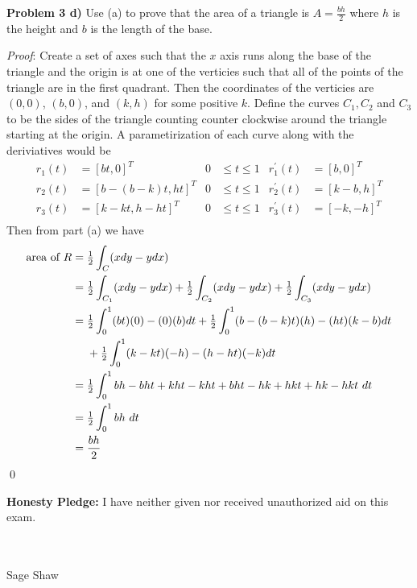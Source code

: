 \documentclass[12pt]{article}
\newcommand{\problem}[1]{\hspace{-4 ex} \large \textbf{Problem #1} }
\renewenvironment{proof}{\hspace{-4 ex} \emph{Proof}:}{\qed}
\begin{document}
\problem{3 d)} Use (a) to prove that the area of a triangle is $A=\tfrac{bh}{2}$ where $h$ is the height and $b$ is the length of the base.

	\begin{proof}
		Create a set of axes such that the $x$ axis runs along the base of the triangle and the origin is at one of the verticies such that all of the points of the triangle are in the first quadrant. Then the coordinates of the verticies are $(0,0)$, $(b,0)$, and $(k,h)$ for some positive $k$. Define the curves $C_1, C_2$ and $C_3$ to be the sides of the triangle counting counter clockwise around the triangle starting at the origin. A parametirization of each curve along with the deriviatives would be
		\begin{align*}
			r_1(t) & = [bt,0]^T & 0 & \leq t \leq 1 & r_1^\prime(t) & = [b,0]^T\\
			r_2(t) & = [b-(b-k)t,ht]^T & 0 & \leq t \leq 1 & r_2^\prime(t) & = [k-b,h]^T\\
			r_3(t) & = [k-kt,h-ht]^T & 0 & \leq t \leq 1 & r_3^\prime(t) & = [-k,-h]^T\\
		\end{align*}
		Then from part (a) we have
		\begin{align*}
			\text{area of }R & = \tfrac{1}{2}\int_C(xdy-ydx) \\
			& = \tfrac{1}{2}\int_{C_1}(xdy-ydx) +\tfrac{1}{2}\int_{C_2}(xdy-ydx) +\tfrac{1}{2}\int_{C_3}(xdy-ydx) \\ 
			& = \tfrac{1}{2}\int_{0}^1(bt)(0)-(0)(b) dt + \tfrac{1}{2}\int_{0}^1(b-(b-k)t)(h)-(ht)(k-b) dt \\
			& \text{\space\space\space\space} + \tfrac{1}{2}\int_{0}^1(k-kt)(-h)-(h-ht)(-k) dt \\
			& = \tfrac{1}{2}\int_{0}^1 bh - bht + kht - kht + bht -hk + hkt +hk - hkt \text{ } dt \\
			& = \tfrac{1}{2}\int_{0}^1 bh \text{ } dt \\
			& = \frac{bh}{2}
		\end{align*}
	\end{proof}
	
\hspace{-4 ex} \large \textbf{Honesty Pledge:}
	I have neither given nor received unauthorized aid on this exam.\\
	\begin{tabular}{c}
		\text{\space\space\space\space\space\space\space\space\space\space\space\space\space\space\space\space\space\space\space\space\space\space\space\space\space\space\space\space\space\space\space\space\space\space\space\space\space}\\
		\hline
	\end{tabular}\\
	Sage Shaw
\end{document}
